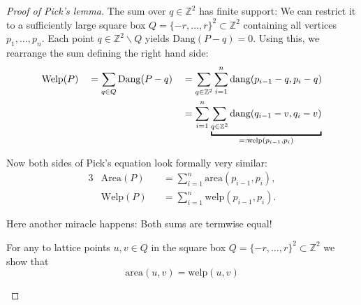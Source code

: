 \documentclass[a4paper]{amsart}
\numberwithin{equation}{section}
\theoremstyle{plain}
\theoremstyle{definition}
\newcommand{\Z}{\mathbb{Z}}
\newcommand{\minus}{\smallsetminus}
\newcommand{\area}{\mathrm{area}}
\newcommand{\Area}{\mathrm{Area}}
\newcommand{\dang}{\mathrm{dang}}
\newcommand{\Dang}{\mathrm{Dang}}
\newcommand{\welp}{\mathrm{welp}}
\newcommand{\Welp}{\mathrm{Welp}}
\begin{document}
\begin{proof}[Proof of Pick's lemma]
  The sum over $q \in \Z^2$ has finite support:
  We can restrict it to a sufficiently large
  square box $Q = \{-r,\ldots,r\}^2 \subset \Z^2$
  containing all vertices $p_1,\ldots,p_n$.
  Each point $q \in \Z^2 \minus Q$ yields $\Dang(P-q) = 0$.
  Using this, we rearrange the sum defining the right hand side:
  \begin{alignat*}{3}
    & \Welp(P)
    && = \sum_{q \in Q} \Dang(P-q)
    && = \sum_{q \in \Z^2} \sum_{i=1}^n \dang(p_{i-1}-q, p_i-q) 
    \\ & && && = \sum_{i=1}^n
    \underbracket{ \sum_{q \in \Z^2} \dang(q_{i-1}-v, q_i-v) }_{\normalsize =: \welp(p_{i-1},p_i)}
  \end{alignat*}

  Now both sides of Pick's equation look formally very similar:
  \begin{alignat*}{3}
    & \Area(P) && = \sum_{i=1}^{n} \area(p_{i-1},p_i) ,
    \\
    & \Welp(P) && = \sum_{i=1}^n \welp(p_{i-1},p_i) .
  \end{alignat*}

  Here another miracle happens:  Both sums are termwise equal!

  For any to lattice points $u,v \in Q$
  in the square box $Q = \{-r,\ldots,r\}^2 \subset \Z^2$
  we show that
  \[
  \area(u,v) = \welp(u,v)
  \]
  
  \begin{figure}[ht]
\end{figure}
\end{proof}
\end{document}
